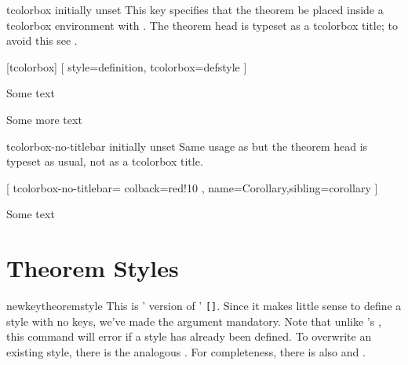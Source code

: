 \documentclass{ltxdoc}
\newcommand{\bracks}[1]{\texttt{[#1]}}
\begin{document}
\begin{docKey}{tcolorbox}
  {}
  {initially unset}
This key specifies that the theorem be placed inside a tcolorbox environment with .
The theorem head is typeset as a tcolorbox title; to avoid this see .

\begin{tcbwritetemp}
[tcolorbox]
[
  style=definition,
  tcolorbox={defstyle}
  ]
\end{tcbwritetemp}

\begin{keythmscode}[withpreamble]
\begin{corollary}
Some text
\end{corollary}
\begin{definition}
Some more text
\end{definition}
\end{keythmscode}

\end{docKey}

\begin{docKey}{tcolorbox-no-titlebar}
  {}
  {initially unset}
Same usage as  but the theorem head is typeset as usual, not as a tcolorbox title.

\begin{tcbwritetemp}
[
  tcolorbox-no-titlebar={
    colback=red!10
    },
  name=Corollary,sibling=corollary
  ]
\end{tcbwritetemp}

\begin{keythmscode}[withpreamble]
\begin{boxcor}
Some text
\end{boxcor}
\end{keythmscode}

\end{docKey}

\section{Theorem Styles}

\begin{docCommand}{newkeytheoremstyle}
  {}
This is ' version of ' \bracks{}. Since it makes little sense to define a style with no keys, we've made the  argument mandatory. Note that unlike 's , this command will error if a style has already been defined. To overwrite an existing style, there is the analogous . For completeness, there is also  and .
\end{docCommand}
\end{document}
